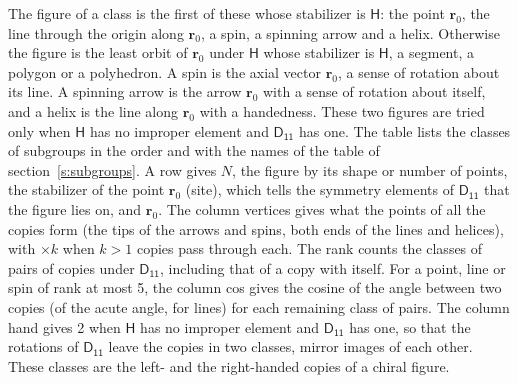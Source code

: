 \documentclass[10pt,a4paper]{article}
\numberwithin{equation}{section}
\newcommand{\grp}[1]{\mathsf{#1}}
\newcommand{\pointr}{\mathbf{r}}
\begin{document}
\leavevmode\label{n:head.figure}The figure of a class is the first of these whose stabilizer is $\grp{H}$: the point $\pointr_0$, the line through the origin along $\pointr_0$, a spin, a spinning arrow and a helix. Otherwise the figure is the least orbit of $\pointr_0$ under $\grp{H}$ whose stabilizer is $\grp{H}$, a segment, a polygon or a polyhedron. A spin is the axial vector $\pointr_0$, a sense of rotation about its line. A spinning arrow is the arrow $\pointr_0$ with a sense of rotation about itself, and a helix is the line along $\pointr_0$ with a handedness. These two figures are tried only when $\grp{H}$ has no improper element and $\grp{D_{11}}$ has one. The table lists the classes of subgroups in the order and with the names of the table of section~\ref{s:subgroups}. \label{n:head.site}A row gives $N$, the figure by its shape or number of points, the stabilizer of the point $\pointr_0$ (site), which tells the symmetry elements of $\grp{D_{11}}$ that the figure lies on, and $\pointr_0$. \label{n:head.vertices}The column vertices gives what the points of all the copies form (the tips of the arrows and spins, both ends of the lines and helices), with ${\times}k$ when $k > 1$ copies pass through each. \label{n:head.rank}The rank counts the classes of pairs of copies under $\grp{D_{11}}$, including that of a copy with itself. \label{n:head.cos}For a point, line or spin of rank at most 5, the column cos gives the cosine of the angle between two copies (of the acute angle, for lines) for each remaining class of pairs. \label{n:head.hand}The column hand gives 2 when $\grp{H}$ has no improper element and $\grp{D_{11}}$ has one, so that the rotations of $\grp{D_{11}}$ leave the copies in two classes, mirror images of each other. These classes are the left- and the right-handed copies of a chiral figure.
\end{document}
